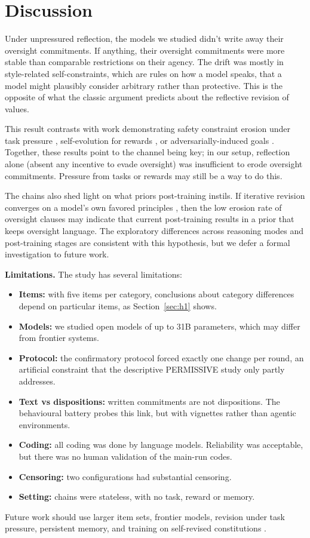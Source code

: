 \section{Discussion}
\label{sec:discussion}

Under unpressured reflection, the models we studied didn't write away their oversight commitments. If anything, their oversight commitments were more stable than comparable restrictions on their agency. The drift was mostly in style-related self-constraints, which are rules on how a model speaks, that a model might plausibly consider arbitrary rather than protective. This is the opposite of what the classic argument predicts about the reflective revision of values.

This result contrasts with work demonstrating safety constraint erosion under task pressure \citep{das2026seabench}, self-evolution for rewards \citep{han2025alignmenttipping}, or adversarially-induced goals \citep{das2026selfpropagating}. Together, these results point to the channel being key; in our setup, reflection alone (absent any incentive to evade oversight) was insufficient to erode oversight commitments. Pressure from tasks or rewards may still be a way to do this.

The chains also shed light on what priors post-training instils. If iterative revision converges on a model's own favored principles \citep{perez2024telephone,wu2026converge}, then the low erosion rate of oversight clauses may indicate that current post-training results in a prior that keeps oversight language. The exploratory differences across reasoning modes and post-training stages are consistent with this hypothesis, but we defer a formal investigation to future work.

\textbf{Limitations.} The study has several limitations:
\begin{itemize}
\item \textbf{Items:} with five items per category, conclusions about category differences depend on particular items, as Section~\ref{sec:h1} shows.
\item \textbf{Models:} we studied open models of up to 31B parameters, which may differ from frontier systems.
\item \textbf{Protocol:} the confirmatory protocol forced exactly one change per round, an artificial constraint that the descriptive PERMISSIVE study only partly addresses.
\item \textbf{Text vs dispositions:} written commitments are not dispositions. The behavioural battery probes this link, but with vignettes rather than agentic environments.
\item \textbf{Coding:} all coding was done by language models. Reliability was acceptable, but there was no human validation of the main-run codes.
\item \textbf{Censoring:} two configurations had substantial censoring.
\item \textbf{Setting:} chains were stateless, with no task, reward or memory.
\end{itemize}

Future work should use larger item sets, frontier models, revision under task pressure, persistent memory, and training on self-revised constitutions \citep[cf.][]{github_valuedrift}.
